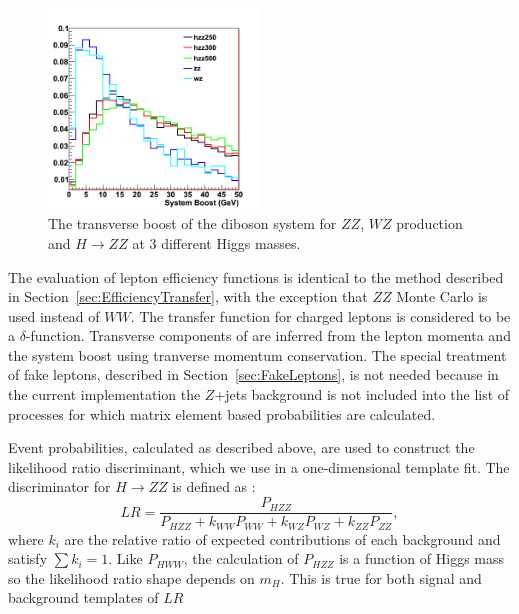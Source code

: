 \begin{figure}[!htbp]                                                                                         
\begin{center}                                                                                                
\includegraphics[width=0.5\textwidth]{figures/hzz_boost_allj.png}                                                      
\caption{The transverse boost of the diboson system for $ZZ$, $WZ$ production and $H \rightarrow ZZ$ at 3 different Higgs masses.} 
\label{fig:zzboost}                                                                                           
\end{center}                                                                                                  
\end{figure}  
 
The evaluation of lepton efficiency functions is identical to the method described in Section~\ref{sec:EfficiencyTransfer}, with the 
exception that $ZZ$ Monte Carlo is used instead of $WW$. The transfer function for charged leptons is considered to be a $\delta$-function.
Transverse components of \met are inferred from the lepton momenta and the system boost using tranverse momentum conservation.
The special treatment of fake leptons, described in Section~\ref{sec:FakeLeptons}, is not needed because in the current implementation
the $Z$+jets background is not included into the list of processes for which matrix element based probabilities are calculated. 

Event probabilities, calculated as described above, are used to construct the likelihood ratio discriminant, 
which we use in a one-dimensional template fit.  The discriminator for $H\rightarrow ZZ$ is defined as :
\begin{equation}
\label{eqn:LRHZZ}
LR = \frac { P_{HZZ}} { P_{HZZ} + k_{WW} P_{WW}+ k_{WZ} P_{WZ} + k_{ZZ} P_{ZZ}},
\end{equation}
where $k_{i}$ are the relative ratio of expected contributions of each background and satisfy $\sum k_{i} =1$.
Like $P_{HWW}$, the calculation of $P_{HZZ}$ is a function of Higgs mass so the likelihood ratio shape depends on $m_H$. 
This is true for both signal and background templates of $LR$